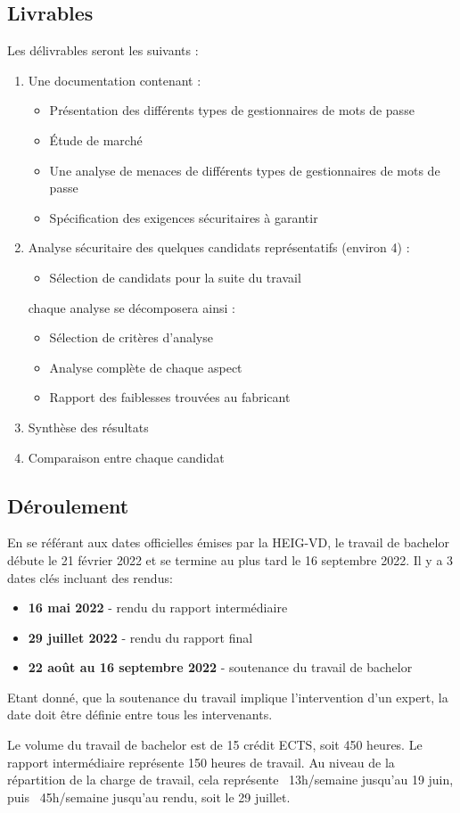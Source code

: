 \subsection*{Livrables}
Les délivrables seront les suivants :
\begin{enumerate}
\item Une documentation contenant :
	\begin{itemize}
	\item Présentation des différents types de gestionnaires de mots de passe
	\item Étude de marché
	\item Une analyse de menaces de différents types de gestionnaires de mots de passe
	\item Spécification des exigences sécuritaires à garantir
	\end{itemize}
\item Analyse sécuritaire des quelques candidats représentatifs (environ 4) :
	\begin{itemize}
	\item Sélection de candidats pour la suite du travail
	\end{itemize}
chaque analyse se décomposera ainsi :
	\begin{itemize}
		\item Sélection de critères d'analyse
		\item Analyse complète de chaque aspect
		\item Rapport des faiblesses trouvées au fabricant
	\end{itemize}
\item Synthèse des résultats
\item Comparaison entre chaque candidat
\end{enumerate}

\subsection*{Déroulement}
En se référant aux dates officielles émises par la HEIG-VD, le travail de bachelor débute le 21 février 2022 et se termine au plus tard le 16 septembre 2022. Il y a 3 dates clés incluant des rendus:
\begin{itemize}
	\item \textbf{16 mai 2022} - rendu du rapport intermédiaire
	\item \textbf{29 juillet 2022} - rendu du rapport final
	\item \textbf{22 août au 16 septembre 2022} - soutenance du travail de bachelor
\end{itemize}

Etant donné, que la soutenance du travail implique l'intervention d'un expert, la date doit être définie entre tous les intervenants.

Le volume du travail de bachelor est de 15 crédit ECTS, soit 450 heures. Le rapport intermédiaire représente 150 heures de travail. Au niveau de la répartition de la charge de travail, cela représente ~13h/semaine jusqu'au 19 juin, puis ~45h/semaine jusqu'au rendu, soit le 29 juillet. 

